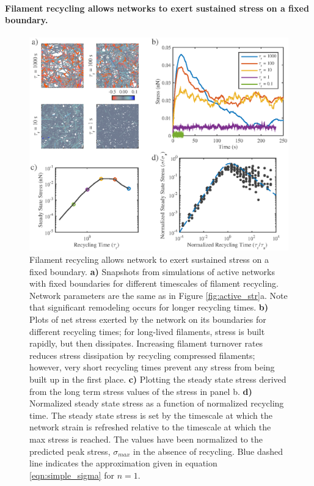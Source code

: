 \documentclass[10pt,letterpaper]{article}
\begin{document}
\paragraph{Filament recycling allows networks to exert sustained stress on a fixed boundary.}

\begin{figure}[h!]
	\centering
	\includegraphics[width=\hsize]{figures/figure7}
	\caption{\label{fig:active_rec} Filament recycling allows network to exert sustained stress on a fixed boundary. \textbf{a)} Snapshots from simulations of active networks with fixed boundaries for different timescales of filament recycling.  Network parameters are the same as in Figure \ref{fig:active_str}a. Note that significant remodeling occurs for longer recycling times. \textbf{b)} Plots of net stress exerted by the network on its boundaries for different recycling times; for long-lived filaments, stress is built rapidly, but then dissipates. Increasing filament turnover rates reduces stress dissipation by recycling compressed filaments; however, very short recycling times prevent any stress from being built up in the first place. \textbf{c)} Plotting the steady state stress derived from the long term stress values of the stress in panel b.  \textbf{d)} Normalized steady state stress as a function of normalized recycling time. The steady state stress is set by the timescale at which the network strain is refreshed relative to the timescale at which the max stress is reached. The values have been normalized to the predicted peak stress, $\sigma_{max}$ in the absence of recycling. Blue dashed line indicates the approximation given in equation \ref{eqn:simple_sigma} for $n=1$.}
\end{figure}
\end{document}
